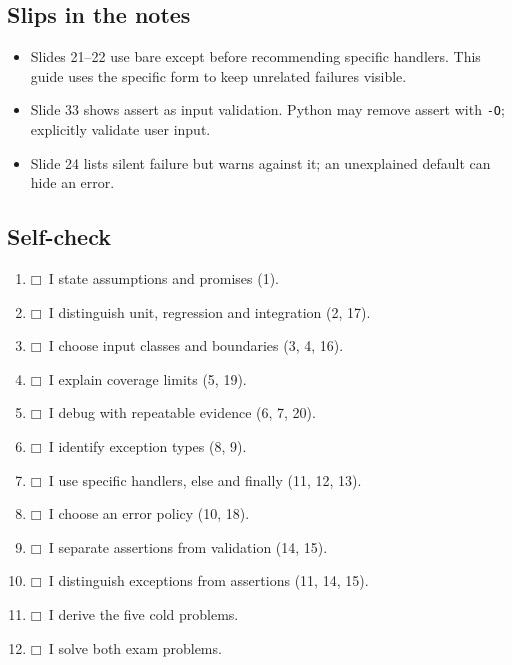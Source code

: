 \documentclass[11pt]{article}
\begin{document}
\begin{keepsection}
\section{Slips in the notes}

\begin{itemize}
\item Slides 21–22 use bare except before recommending specific handlers. This guide uses the specific form to keep unrelated failures visible.
\item Slide 33 shows assert as input validation. Python may remove assert with \texttt{-O}; explicitly validate user input.
\item Slide 24 lists silent failure but warns against it; an unexplained default can hide an error.
\end{itemize}
\end{keepsection}

\begin{keepsection}
\section{Self-check}

\begin{enumerate}
\item $\mdlgwhtsquare$\  I state assumptions and promises (1).
\item $\mdlgwhtsquare$\  I distinguish unit, regression and integration (2, 17).
\item $\mdlgwhtsquare$\  I choose input classes and boundaries (3, 4, 16).
\item $\mdlgwhtsquare$\  I explain coverage limits (5, 19).
\item $\mdlgwhtsquare$\  I debug with repeatable evidence (6, 7, 20).
\item $\mdlgwhtsquare$\  I identify exception types (8, 9).
\item $\mdlgwhtsquare$\  I use specific handlers, else and finally (11, 12, 13).
\item $\mdlgwhtsquare$\  I choose an error policy (10, 18).
\item $\mdlgwhtsquare$\  I separate assertions from validation (14, 15).
\item $\mdlgwhtsquare$\  I distinguish exceptions from assertions (11, 14, 15).
\item $\mdlgwhtsquare$\  I derive the five cold problems.
\item $\mdlgwhtsquare$\  I solve both exam problems.
\end{enumerate}
\end{keepsection}
\end{document}
